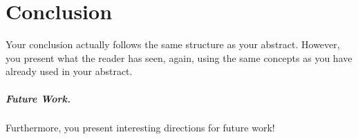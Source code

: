 \chapter{Conclusion}
\label{chap:conclusion}

Your conclusion actually follows the same structure as your abstract.
However, you present what the reader has seen, again, using the same concepts as you have already used in your abstract.

\paragraph{Future Work.}
Furthermore, you present interesting directions for future work!
